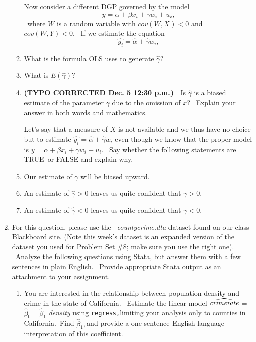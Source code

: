 \documentclass[11pt]{article}
\begin{document}
\begin{enumerate}
\begin{enumerate}
Now consider a different DGP governed by the model%
\begin{equation*}
y=\alpha +\beta x_{i}+\gamma w_{i}+u_{i},
\end{equation*}%
\bigskip\ where $W$ is a random variable with $cov(W,X)<0$ and $cov(W,Y)<0.$
\ If we estimate the equation 
\begin{equation*}
\widehat{y_{i}}=\widehat{\alpha }+\widehat{\gamma }w_{i},
\end{equation*}

\item What is the formula OLS uses to generate $\widehat{\gamma }$? $\ $

\item What is $E\left( \widehat{\gamma }\right) $?

\item \textbf{(TYPO CORRECTED Dec. 5 12:30 p.m.) \ }Is $\widehat{\gamma }$
is a biased estimate of the parameter $\gamma $ due to the omission of $x$?
\ Explain your answer in both words and mathematics. \bigskip \bigskip 

Let's say that a measure of $X$ is not available and we thus have no choice
but to estimate $\widehat{y_{i}}=\widehat{\alpha }+\widehat{\gamma }w_{i}$
even though we know that the proper model is $y=\alpha +\beta x_{i}+\gamma
w_{i}+u_{i}.$ \ Say whether the following statements are TRUE\ or FALSE and
explain why.\bigskip 

\item Our estimate of $\gamma $ will be biased upward.

\item An estimate of $\widehat{\gamma }>0$ leaves us quite confident that $%
\gamma >0.$

\item An estimate of $\widehat{\gamma }<0$ leaves us quite confident that $%
\gamma <0.$\bigskip 
\end{enumerate}

\item For this question, please use the \textit{\ countycrime.dta} dataset
found on our class Blackboard site. (Note this week's dataset is an expanded
version of the dataset you used for Problem Set \#8; make sure you use the
right one). \ Analyze the following questions using Stata, but answer them
with a few sentences in plain English. \ Provide appropriate Stata output as
an attachment to your assignment.\bigskip 

\begin{enumerate}
\item You are interested in the relationship between population density and
crime in the state of California. \ Estimate the linear model $\widehat{%
\mathit{crimerate}}$ =$\widehat{\beta }_{0}+\widehat{\beta }_{1}$\textit{%
density} using \texttt{regress,}limiting your analysis only to counties in
California.\texttt{\ }Find $\widehat{\beta }_{1},$and provide a one-sentence
English-language interpretation of this coefficient.


\end{enumerate}
\end{enumerate}
\end{document}
